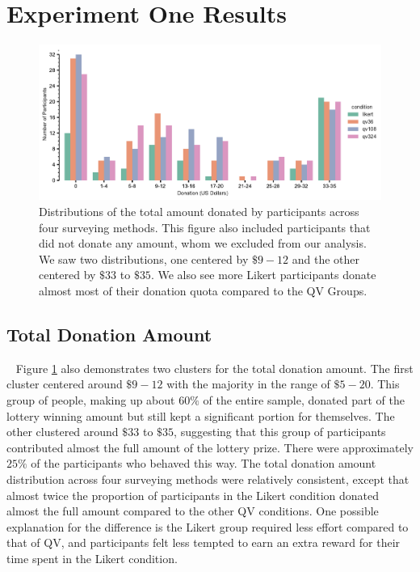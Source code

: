 \section{Experiment One Results}
\begin{figure}[htpb]
    \centering
    \includegraphics[width=\textwidth, keepaspectratio=true]{content/image/total_contributions_across_conditions.pdf}
    \caption{
       Distributions of the total amount donated by participants across four surveying methods. This figure also included participants that did not donate any amount, whom we excluded from our analysis. We saw two distributions, one centered by $\$9-12$ and the other centered by $\$33$ to $\$35$. We also see more Likert participants donate almost most of their donation quota compared to the QV Groups.
    }
    \label{fig:total_don_exp1}
\end{figure}

\subsection{Total Donation Amount}~\label{total_donation}
Figure \ref{fig:total_don_exp1} also demonstrates two clusters for the total donation amount. The first cluster centered around $\$9-12$ with the majority in the range of $\$5-20$. This group of people, making up about $60\%$ of the entire sample, donated part of the lottery winning amount but still kept a significant portion for themselves. The other clustered around $\$33$ to $\$35$, suggesting that this group of participants
contributed almost the full amount of the lottery prize. There were approximately $25\%$ of the participants who behaved this way. The total donation amount distribution across four surveying methods were relatively consistent, except that almost twice the proportion of participants in the Likert condition donated almost the full amount compared to the other QV conditions. One possible explanation for the difference is 
the Likert group required less effort compared to that of QV, and participants felt less tempted to earn an extra reward for their time spent in the Likert condition. 

